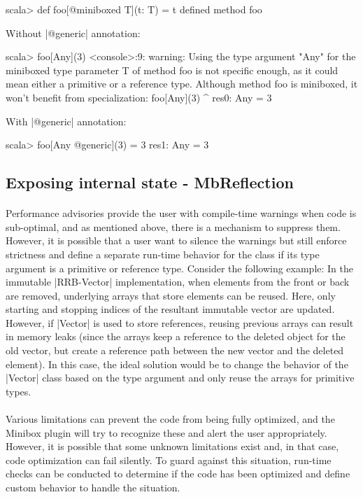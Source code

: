 \begin{lstlisting-nobreak}
scala> def foo[@miniboxed T](t: T) = t
defined method foo
\end{lstlisting-nobreak}
Without |@generic| annotation: 

\begin{lstlisting-nobreak}
scala> foo[Any](3)
<console>:9: warning: Using the type argument "Any" for the miniboxed type parameter T of method foo is not specific enough, as it could mean either a primitive or a reference type. Although method foo is miniboxed, it won't benefit from specialization:
              foo[Any](3)
                 ^
res0: Any = 3
\end{lstlisting-nobreak}
With |@generic| annotation: 

\begin{lstlisting-nobreak}
scala> foo[Any @generic](3) = 3
res1: Any = 3
\end{lstlisting-nobreak}

\subsection{Exposing internal state - MbReflection}
\paragraph{}
Performance advisories provide the user with compile-time warnings when code is sub-optimal, and as mentioned above, there is a mechanism to suppress them. However, it is possible that a user want to silence the warnings but still enforce strictness and define a separate run-time behavior for the class if its type argument is a primitive or reference type. Consider the following example: In the immutable |RRB-Vector| implementation, when elements from the front or back are removed, underlying arrays that store elements can be reused. Here, only starting and stopping indices of the resultant immutable vector are updated. However, if |Vector| is used to store references, reusing previous arrays can result in memory leaks (since the arrays keep a reference to the deleted object for the old vector, but create a reference path between the new vector and the deleted element). In this case, the ideal solution would be to change the behavior of the |Vector| class based on the type argument and only reuse the arrays for primitive types.

\paragraph{}
Various limitations can prevent the code from being fully optimized, and the Minibox plugin will try to recognize these and alert the user appropriately. However, it is possible that some unknown limitations exist and, in that case, code optimization can fail silently. To guard against this situation, run-time checks can be conducted to determine if the code has been optimized and define custom behavior to handle the situation.

